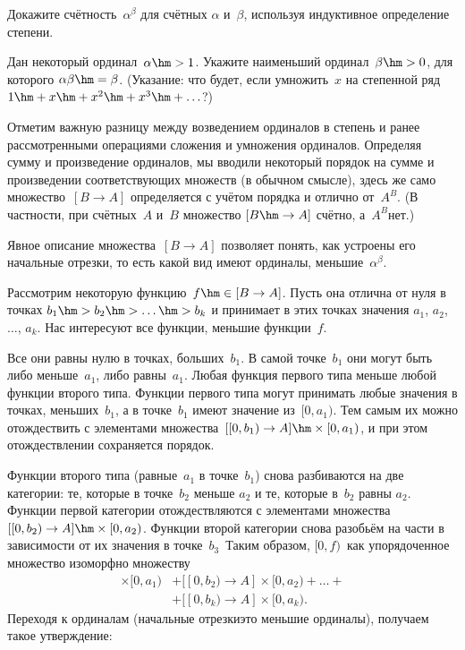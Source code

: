 \begin{problem}
Докажите счётность~$\alpha^\beta$ для счётных $\alpha$ и~$\beta$,
используя индуктивное определение степени.
\end{problem}

\begin{problem}
Дан некоторый ординал~$\alpha\hm>1$. Укажите наименьший
ординал~$\beta\hm>0$, для которого $\alpha\beta\hm=\beta$.
(Указание: что будет, если умножить~$x$ на степенной
ряд $1\hm+x\hm+x^2\hm+x^3\hm+\ldots$?)
\end{problem}

\problskip
Отметим важную разницу между возведением ординалов
в степень и ранее рассмотренными операциями сложения и умножения
ординалов.
Определяя сумму и произведение ординалов,
мы вводили некоторый
порядок на сумме и произведении соответствующих
множеств (в
обычном смысле), здесь же само множество~${[B\to A]}$ определяется с
учётом порядка и отлично от~$A^B$. (В частности,
при счётных~$A$ и~$B$ множество
${[B\hm\to A]}$ счётно, а~$A^B$\т нет.)

\smallskip

Явное описание множества~$[B\to A]$ позволяет понять, как
устроены его начальные отрезки, то есть какой вид имеют
ординалы, меньшие~$\alpha^\beta$.

Рассмотрим некоторую функцию~$f\hm\in [B\to A]$. Пусть она
отлична от нуля в точках $b_1\hm>b_2\hm>\ldots\hm>b_k$ и принимает
в этих точках значения $a_1$, $a_2$, $\dots$, $a_k$. Нас интересуют все
функции, меньшие функции~$f$.

Все они равны нулю в точках, больших~$b_1$. В самой точке~$b_1$
они могут быть либо меньше~$a_1$, либо равны~$a_1$. Любая
функция первого типа меньше любой функции второго типа. Функции
первого типа могут принимать любые значения в точках, меньших~$b_1$, а
в точке~$b_1$ имеют значение из~$[0,a_1)$. Тем самым их
можно отождествить с элементами множества~$[[0,b_1)\to A]\hm\times
[0,a_1)$, и при этом отождествлении сохраняется порядок.

Функции второго типа (равные~$a_1$ в точке~$b_1$) снова
разбиваются на две категории: те, которые в точке~$b_2$ меньше $a_2$ и
те, которые в~$b_2$ равны $a_2$. Функции первой категории
отождествляются с элементами множества
$[[0,b_2)\to A]\hm\times [0,a_2)$.
Функции второй категории снова разобьём на части в зависимости
от их значения в точке~$b_3$~ Таким образом, $[0,f)$~как
упорядоченное множество изоморфно множеству
\begin{align*}
 [[0,b_1)\to A]\times [0,a_1)&+ [[0,b_2)\to A]\times [0,a_2)+\ldots+\\
  &+[[0,b_k)\to A]\times [0,a_k).
\end{align*}
Переходя к ординалам (начальные отрезки\т это меньшие ординалы),
получаем такое утверждение:

